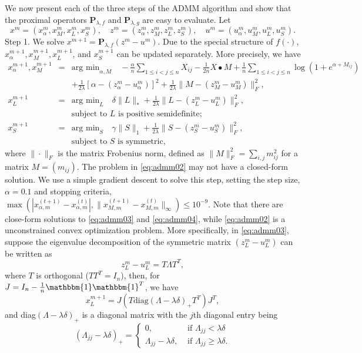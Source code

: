 \documentclass[AMS,STIX1COL]{WileyNJD-v2}
\begin{document}
We now present each of the three steps of the ADMM algorithm and show that the proximal
operators $\mathbf{P}_{\lambda,f}$ and $\mathbf{P}_{\lambda,g}$ are easy to evaluate.
Let
$$
x^m = (x^m_\alpha, x^m_M, x^m_L, x^m_S), \quad
z^m = (z^m_\alpha, z^m_M, z^m_L, z^m_S), \quad
u^m = (u^m_\alpha, u^m_M, u^m_L, u^m_S).
$$
Step 1. We solve $x^{m+1} = \mathbf{P}_{\lambda,f}(z^m - u^m)$.
Due to the special structure of $f(\cdot)$,
$x^{m+1}_\alpha, x^{m+1}_M, x^{m+1}_L$, and $x^{m+1}_S$
can be updated separately.
More precisely, we have
\begin{eqnarray}
x^{m+1}_\alpha, x^{m+1}_M &=& \mbox{arg min}_{\alpha, M} \quad
-\frac{\alpha}{n} \sum_{1\le i< j\le n}X_{ij}
-\frac{1}{2n} X \bullet M
+ \frac{1}{n} \sum_{1\le i<j\le n} \log \left(1 + e^{\alpha + M_{ij}}\right) \nonumber \\
&& + \frac{1}{2\lambda}\left[\alpha - (z^m_\alpha - u^m_\alpha)\right]^2
+ \frac{1}{2\lambda}\|M - (z^m_M - u^m_M)\|^2_F, \label{eq:admm02} \\
x^{m+1}_L &=& \mbox{arg min}_{ L} \quad \delta \|L\|_\ast
+ \frac{1}{2\lambda}\|L - (z^m_L - u^m_L)\|^2_F,\label{eq:admm03}
\\
&& \mbox{subject to $L$ is positive semidefinite;} \nonumber \\
x^{m+1}_S &=& \mbox{arg min}_{ S} \quad  \gamma \|S\|_1
+ \frac{1}{2\lambda}\|S - (z^m_S - u^m_S)\|^2_F,
\label{eq:admm04}
\\
&& \mbox{subject to $S$ is symmetric,} \nonumber
\end{eqnarray}
where $\|\cdot\|_F$ is the matrix Frobenius norm, defined as
$\|M\|^2_F = \sum_{i,j} m^2_{ij}$ for a matrix $M = (m_{ij})$.
The problem in \eqref{eq:admm02} may not have a closed-form solution.
We use a simple gradient descent to solve this step, setting the step size, $\alpha=0.1$ and stopping criteria, $\max(|x_{\alpha,m}^{(t+1)}-x_{\alpha,m}^{(t)}|,\|x_{M,m}^{(t+1)}-x_{M,m}^{(t)}\|_{\infty}) \leq 10^{-9}$.
Note that there are close-form solutions to \eqref{eq:admm03} and \eqref{eq:admm04}, while \eqref{eq:admm02} is a unconstrained convex optimization problem.
More specifically, in \eqref{eq:admm03}, suppose the eigenvalue decomposition of the symmetric matrix $(z^m_L - u^m_L)$ can be written as
$$
z^m_L - u^m_L = T \Lambda T^T,
$$
where $T$ is orthogonal ($T T^T = I_n$), then, for $J=I_{n}-\frac{1}{n}\mathbbm{1}\mathbbm{1}^T$, we have
$$
x^{m+1}_L = J (T \mbox{diag}(\Lambda-\lambda \delta)_+ T^T)J^{T},
$$
and diag$(\Lambda-\lambda \delta)_+$ is a diagonal matrix with the $j$th
diagonal entry being
$$
(\Lambda_{jj}-\lambda \delta)_+ = \left\{
\begin{array}{ll}
0, & \mbox{ if } \Lambda_{jj} < \lambda \delta \\
\Lambda_{jj}-\lambda \delta, & \mbox{ if } \Lambda_{jj} \ge \lambda \delta .
\end{array}
\right.
$$
\end{document}
